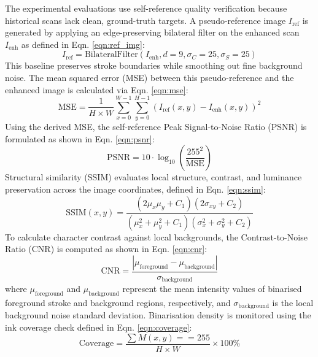 The experimental evaluations use self-reference quality verification because historical scans lack clean, ground-truth targets. A pseudo-reference image $I_{\text{ref}}$ is generated by applying an edge-preserving bilateral filter on the enhanced scan $I_{\text{enh}}$ as defined in Eqn. \ref{eqn:ref_img}:
\begin{equation}
\label{eqn:ref_img}
I_{\text{ref}} = \text{BilateralFilter}(I_{\text{enh}}, d=9, \sigma_C=25, \sigma_S=25)
\end{equation}
This baseline preserves stroke boundaries while smoothing out fine background noise. The mean squared error (MSE) between this pseudo-reference and the enhanced image is calculated via Eqn. \ref{eqn:mse}:
\begin{equation}
\label{eqn:mse}
\text{MSE} = \frac{1}{H \times W} \sum_{x=0}^{W-1} \sum_{y=0}^{H-1} \left( I_{\text{ref}}(x, y) - I_{\text{enh}}(x, y) \right)^2
\end{equation}
Using the derived MSE, the self-reference Peak Signal-to-Noise Ratio (PSNR) is formulated as shown in Eqn. \ref{eqn:psnr}:
\begin{equation}
\label{eqn:psnr}
\text{PSNR} = 10 \cdot \log_{10}\left( \frac{255^2}{\text{MSE}} \right)
\end{equation}
Structural similarity (SSIM) evaluates local structure, contrast, and luminance preservation across the image coordinates, defined in Eqn. \ref{eqn:ssim}:
\begin{equation}
\label{eqn:ssim}
\text{SSIM}(x, y) = \frac{(2\mu_x\mu_y + C_1)(2\sigma_{xy} + C_2)}{(\mu_x^2 + \mu_y^2 + C_1)(\sigma_x^2 + \sigma_y^2 + C_2)}
\end{equation}
To calculate character contrast against local backgrounds, the Contrast-to-Noise Ratio (CNR) is computed as shown in Eqn. \ref{eqn:cnr}:
\begin{equation}
\label{eqn:cnr}
\text{CNR} = \frac{|\mu_{\text{foreground}} - \mu_{\text{background}}|}{\sigma_{\text{background}}}
\end{equation}
where $\mu_{\text{foreground}}$ and $\mu_{\text{background}}$ represent the mean intensity values of binarised foreground stroke and background regions, respectively, and $\sigma_{\text{background}}$ is the local background noise standard deviation. Binarisation density is monitored using the ink coverage check defined in Eqn. \ref{eqn:coverage}:
\begin{equation}
\label{eqn:coverage}
\text{Coverage} = \frac{\sum M(x, y) == 255}{H \times W} \times 100\%
\end{equation}


